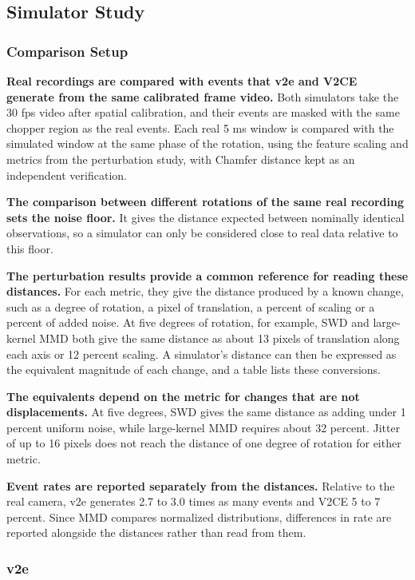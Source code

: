 \subsection{Simulator Study}

\subsubsection{Comparison Setup}

\textbf{Real recordings are compared with events that v2e and V2CE generate from the same calibrated frame video.} Both simulators take the 30 fps video after spatial calibration, and their events are masked with the same chopper region as the real events. Each real 5 ms window is compared with the simulated window at the same phase of the rotation, using the feature scaling and metrics from the perturbation study, with Chamfer distance kept as an independent verification.

\textbf{The comparison between different rotations of the same real recording sets the noise floor.} It gives the distance expected between nominally identical observations, so a simulator can only be considered close to real data relative to this floor.

\textbf{The perturbation results provide a common reference for reading these distances.} For each metric, they give the distance produced by a known change, such as a degree of rotation, a pixel of translation, a percent of scaling or a percent of added noise. At five degrees of rotation, for example, SWD and large-kernel MMD both give the same distance as about 13 pixels of translation along each axis or 12 percent scaling. A simulator's distance can then be expressed as the equivalent magnitude of each change, and a table lists these conversions.

\textbf{The equivalents depend on the metric for changes that are not displacements.} At five degrees, SWD gives the same distance as adding under 1 percent uniform noise, while large-kernel MMD requires about 32 percent. Jitter of up to 16 pixels does not reach the distance of one degree of rotation for either metric.

\textbf{Event rates are reported separately from the distances.} Relative to the real camera, v2e generates 2.7 to 3.0 times as many events and V2CE 5 to 7 percent. Since MMD compares normalized distributions, differences in rate are reported alongside the distances rather than read from them.

\subsubsection{v2e}

